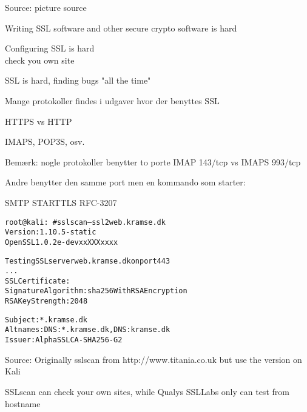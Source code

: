 \documentclass[Screen16to9,17pt]{foils}
\begin{document}

Source: picture source\\ {\footnotesize{}}
\begin{list2}
\item Writing SSL software and other secure crypto software is hard
\item Configuring SSL is hard\\
check you own site 
\item SSL is hard, finding bugs "all the time"
\end{list2}





\begin{list1}
\item Mange protokoller findes i udgaver hvor der benyttes SSL
\item HTTPS vs HTTP
\item IMAPS, POP3S, osv.
\item Bemærk: nogle protokoller benytter to porte IMAP 143/tcp vs IMAPS 993/tcp
\item Andre benytter den samme port men en kommando som starter:
\item SMTP STARTTLS RFC-3207
\end{list1}




\begin{alltt}\small
root@kali:~# sslscan --ssl2 web.kramse.dk
Version: 1.10.5-static
OpenSSL 1.0.2e-dev xx XXX xxxx

Testing SSL server web.kramse.dk on port 443
...
  SSL Certificate:
Signature Algorithm: sha256WithRSAEncryption
RSA Key Strength:    2048

Subject:  *.kramse.dk
Altnames: DNS:*.kramse.dk, DNS:kramse.dk
Issuer:   AlphaSSL CA - SHA256 - G2
\end{alltt}

Source:
Originally sslscan from http://www.titania.co.uk
 but use the version on Kali

SSLscan can check your own sites, while Qualys SSLLabs only can test from hostname
\end{document}
